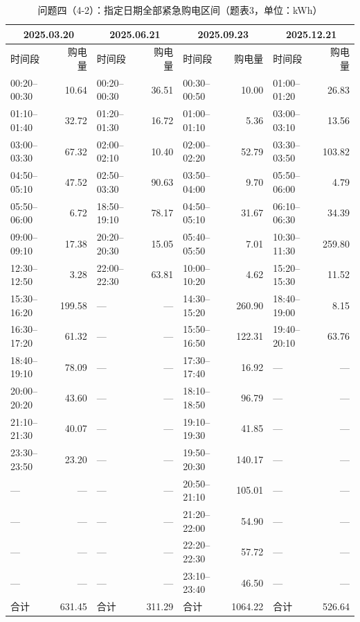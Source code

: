 \FloatBarrier
\begin{table}[H]
\centering\footnotesize
\setlength{\tabcolsep}{2.5pt}
\caption{问题四（4-2）：指定日期全部紧急购电区间（题表3，单位：kWh）}
\label{tab:required-q42-emergency}
\begin{tabular}{@{}lrlrlrlr@{}}
\toprule
\multicolumn{2}{c}{2025.03.20} & \multicolumn{2}{c}{2025.06.21} & \multicolumn{2}{c}{2025.09.23} & \multicolumn{2}{c}{2025.12.21} \\
\midrule
时间段 & 购电量 & 时间段 & 购电量 & 时间段 & 购电量 & 时间段 & 购电量 \\
\midrule
00:20--00:30 & 10.64 & 00:20--00:30 & 36.51 & 00:30--00:50 & 10.00 & 01:00--01:20 & 26.83 \\
01:10--01:40 & 32.72 & 01:20--01:30 & 16.72 & 01:00--01:10 & 5.36 & 03:00--03:10 & 13.56 \\
03:00--03:30 & 67.32 & 02:00--02:10 & 10.40 & 02:00--02:20 & 52.79 & 03:30--03:50 & 103.82 \\
04:50--05:10 & 47.52 & 02:50--03:30 & 90.63 & 03:50--04:00 & 9.70 & 05:50--06:00 & 4.79 \\
05:50--06:00 & 6.72 & 18:50--19:10 & 78.17 & 04:50--05:10 & 31.67 & 06:10--06:30 & 34.39 \\
09:00--09:10 & 17.38 & 20:20--20:30 & 15.05 & 05:40--05:50 & 7.01 & 10:30--11:30 & 259.80 \\
12:30--12:50 & 3.28 & 22:00--22:30 & 63.81 & 10:00--10:20 & 4.62 & 15:20--15:30 & 11.52 \\
15:30--16:20 & 199.58 & — & — & 14:30--15:20 & 260.90 & 18:40--19:00 & 8.15 \\
16:30--17:20 & 61.32 & — & — & 15:50--16:50 & 122.31 & 19:40--20:10 & 63.76 \\
18:40--19:10 & 78.09 & — & — & 17:30--17:40 & 16.92 & — & — \\
20:00--20:20 & 43.60 & — & — & 18:10--18:50 & 96.79 & — & — \\
21:10--21:30 & 40.07 & — & — & 19:10--19:30 & 41.85 & — & — \\
23:30--23:50 & 23.20 & — & — & 19:50--20:30 & 140.17 & — & — \\
— & — & — & — & 20:50--21:10 & 105.01 & — & — \\
— & — & — & — & 21:20--22:00 & 54.90 & — & — \\
— & — & — & — & 22:20--22:30 & 57.72 & — & — \\
— & — & — & — & 23:10--23:40 & 46.50 & — & — \\
合计 & 631.45 & 合计 & 311.29 & 合计 & 1064.22 & 合计 & 526.64 \\
\bottomrule
\end{tabular}
\end{table}

